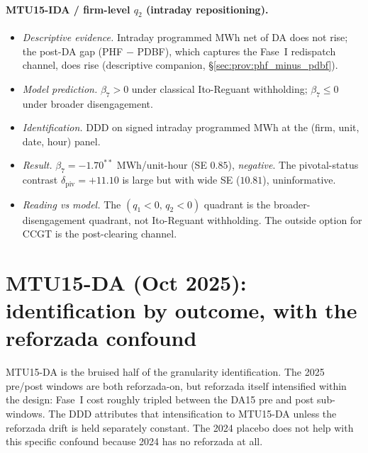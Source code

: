 \documentclass[11pt,a4paper]{article}
\begin{document}
\paragraph{MTU15-IDA / firm-level $q_2$ (intraday repositioning).}
\begin{itemize}
\item \emph{Descriptive evidence.} Intraday programmed MWh net of DA does not rise; the post-DA gap (PHF $-$ PDBF), which captures the Fase~I redispatch channel, does rise (descriptive companion, \S\ref{sec:prov:phf_minus_pdbf}).
\item \emph{Model prediction.} $\beta_7 > 0$ under classical Ito-Reguant withholding; $\beta_7 \le 0$ under broader disengagement.
\item \emph{Identification.} DDD on signed intraday programmed MWh at the (firm, unit, date, hour) panel.
\item \emph{Result.} $\beta_7 = -1.70^{**}$ MWh/unit-hour (SE $0.85$), \emph{negative}. The pivotal-status contrast $\delta_{\text{piv}} = +11.10$ is large but with wide SE ($10.81$), uninformative.
\item \emph{Reading vs model.} The $(q_1 < 0,\,q_2 < 0)$ quadrant is the broader-disengagement quadrant, not Ito-Reguant withholding. The outside option for CCGT is the post-clearing channel.
\end{itemize}

\section{MTU15-DA (Oct 2025): identification by outcome, with the reforzada confound}\label{sec:ident:mtu15da}

MTU15-DA is the bruised half of the granularity identification. The 2025 pre/post windows are both reforzada-on, but reforzada itself intensified within the design: Fase~I cost roughly tripled between the DA15 pre and post sub-windows. The DDD attributes that intensification to MTU15-DA unless the reforzada drift is held separately constant. The 2024 placebo does not help with this specific confound because 2024 has no reforzada at all.
\end{document}
